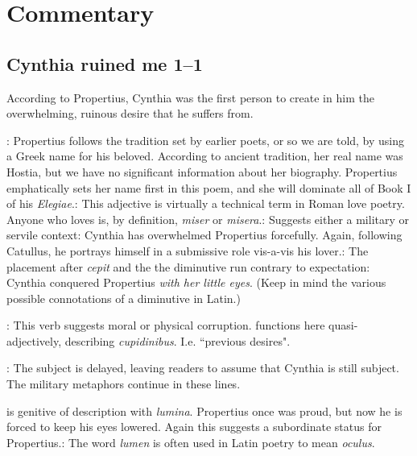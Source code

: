\chapter*{Commentary}

\section*{Cynthia ruined me 1--1}

According to Propertius, Cynthia was the first person to create in him the overwhelming, ruinous desire that he suffers from.


: Propertius follows the tradition set by earlier poets, or so we are told, by using a Greek name for his beloved.  According to ancient tradition, her real name was Hostia, but we have no significant information about her biography.  Propertius emphatically sets her name first in this poem, and she will dominate all of Book I of his \textit{Elegiae}.\indent{}: This adjective is virtually a technical term in Roman love poetry.  Anyone who loves is, by definition, \textit{miser} or \textit{misera}.\indent{}: Suggests either a military or servile context: Cynthia has overwhelmed Propertius forcefully. Again, following Catullus, he portrays himself in a submissive role vis-a-vis his lover.\indent{}: The placement after \textit{cepit} and the the diminutive run contrary to expectation: Cynthia conquered Propertius \textit{with her little eyes}.  (Keep in mind the various possible connotations of a diminutive in Latin.)


: This verb suggests moral or physical corruption.\indent{} functions here quasi-adjectively, describing \textit{cupidinibus}.  I.e. ``previous desires".


: The subject is delayed, leaving readers to assume that Cynthia is still subject.  The military metaphors continue in these lines.


 is genitive of description with \textit{lumina}.  Propertius once was proud, but now he is forced to keep his eyes lowered.  Again this suggests a subordinate status for Propertius.\indent{}: The word \textit{lumen} is often used in Latin poetry to mean \textit{oculus}.


